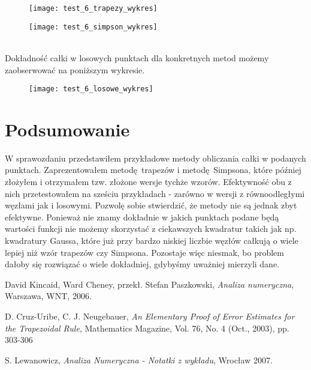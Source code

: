 \documentclass{article}
\begin{document}
  \begin{minipage}{\linewidth}
      \centering
      \begin{minipage}{0.35\linewidth}
          \begin{figure}[H]
              \texttt{[image: test\_6\_trapezy\_wykres]}
          \end{figure}
      \end{minipage}
      \hspace{0.05\linewidth}
      \begin{minipage}{0.35\linewidth}
          \begin{figure}[H]
              \texttt{[image: test\_6\_simpson\_wykres]}
          \end{figure}
      \end{minipage}
  \end{minipage}\\

Dokładność całki w losowych punktach dla konkretnych metod możemy zaobserwować na poniższym wykresie. 

\begin{figure}[h!]
\centering
\texttt{[image: test\_6\_losowe\_wykres]}
\end{figure}



\pagebreak

\section{Podsumowanie}

W sprawozdaniu przedstawiłem przykładowe metody obliczania całki w podanych punktach. Zaprezentowałem metodę trapezów i metodę Simpsona, które później złożyłem i otrzymałem tzw. złożone wersje tychże wzorów. Efektywność obu z nich przetestowałem na sześciu przykładach - zarówno w wersji z równoodległymi węzłami jak i losowymi. Pozwolę sobie stwierdzić, że metody nie są jednak zbyt efektywne. Ponieważ nie znamy dokładnie w jakich punktach podane będą wartości funkcji nie możemy skorzystać z ciekawszych kwadratur takich jak np. kwadratury Gaussa, które już przy bardzo niskiej liczbie węzłów całkują o wiele lepiej niż wzór trapezów czy Simpsona. Pozostaje więc niesmak, bo problem dałoby się rozwiązać o wiele dokładniej, gdybyśmy uważniej mierzyli dane. 

\begin{thebibliography}{99}

 David Kincaid, Ward Cheney, przekł. Stefan Paszkowski,
\emph{Analiza numeryczna},
Warszawa, WNT, 2006.

 D. Cruz-Uribe, C. J. Neugebauer,
\emph{An Elementary Proof of Error Estimates
for the Trapezoidal Rule},
Mathematics Magazine, Vol. 76, No. 4 (Oct., 2003), pp. 303-306

 S. Lewanowicz, {\it Analiza Numeryczna - Notatki z wykładu}, Wrocław 2007.

\end{thebibliography}
\end{document}
